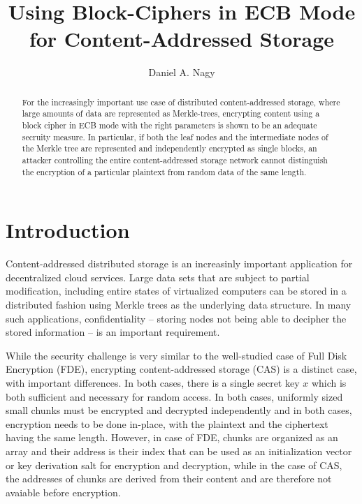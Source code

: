 \documentclass{llncs}
\begin{document}
\title{Using Block-Ciphers in ECB Mode for Content-Addressed Storage}

\author{Daniel A. Nagy}

\maketitle

\begin{abstract}

For the increasingly important use case of distributed content-addressed 
storage, where large amounts of data are represented as Merkle-trees, 
encrypting content using a block cipher in ECB mode with the right 
parameters is shown to be an adequate secruity measure. In particular, 
if both the leaf nodes and the intermediate nodes of the Merkle tree are 
represented and independently encrypted as single blocks, an attacker 
controlling the entire content-addressed storage network cannot 
distinguish the encryption of a particular plaintext from random data of 
the same length.

\end{abstract}

\section{Introduction}\label{sec:Introduction}

Content-addressed distributed storage is an increasinly important 
application for decentralized cloud services. Large data sets that are 
subject to partial modification, including entire states of virtualized 
computers can be stored in a distributed fashion using Merkle trees as 
the underlying data structure\cite{cas}. In many such applications, 
confidentiality -- storing nodes not being able to decipher the stored 
information -- is an important requirement.

While the security challenge is very similar to the well-studied case of 
Full Disk Encryption\cite{fde} (FDE), encrypting content-addressed 
storage (CAS) is a distinct case, with important differences. In both 
cases, there is a single secret key $x$ which is both sufficient and 
necessary for random access. In both cases, uniformly sized small chunks 
must be encrypted and decrypted independently and in both cases, 
encryption needs to be done in-place, with the plaintext and the 
ciphertext having the same length. However, in case of FDE, chunks are 
organized as an array and their address is their index that can be used 
as an initialization vector or key derivation salt for encryption and 
decryption, while in the case of CAS, the addresses of chunks are 
derived from their content and are therefore not avaiable before 
encryption.
\end{document}
